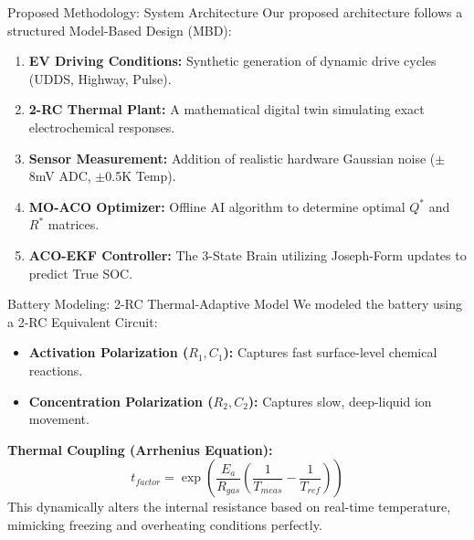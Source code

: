 \documentclass[aspectratio=169]{beamer}
\begin{document}
\begin{frame}{Proposed Methodology: System Architecture}
    Our proposed architecture follows a structured Model-Based Design (MBD):
    \begin{enumerate}
        \item \textbf{EV Driving Conditions:} Synthetic generation of dynamic drive cycles (UDDS, Highway, Pulse).
        \item \textbf{2-RC Thermal Plant:} A mathematical digital twin simulating exact electrochemical responses.
        \item \textbf{Sensor Measurement:} Addition of realistic hardware Gaussian noise ($\pm$8mV ADC, $\pm$0.5K Temp).
        \item \textbf{MO-ACO Optimizer:} Offline AI algorithm to determine optimal $Q^*$ and $R^*$ matrices.
        \item \textbf{ACO-EKF Controller:} The 3-State Brain utilizing Joseph-Form updates to predict True SOC.
    \end{enumerate}
\end{frame}

\begin{frame}{Battery Modeling: 2-RC Thermal-Adaptive Model}
    We modeled the battery using a 2-RC Equivalent Circuit:
    \begin{itemize}
        \item \textbf{Activation Polarization ($R_1, C_1$):} Captures fast surface-level chemical reactions.
        \item \textbf{Concentration Polarization ($R_2, C_2$):} Captures slow, deep-liquid ion movement.
    \end{itemize}
    \vspace{0.3cm}
    \textbf{Thermal Coupling (Arrhenius Equation):}
    \begin{equation}
        t_{factor} = \exp\left(\frac{E_a}{R_{gas}} \left(\frac{1}{T_{meas}} - \frac{1}{T_{ref}}\right)\right)
    \end{equation}
    This dynamically alters the internal resistance based on real-time temperature, mimicking freezing and overheating conditions perfectly.
\end{frame}
\end{document}

